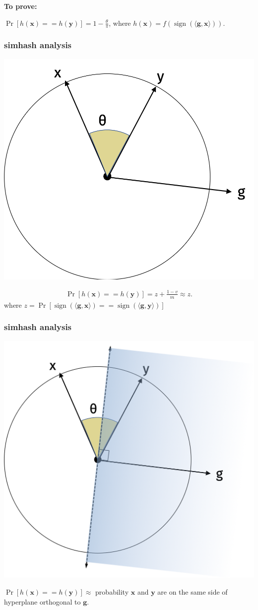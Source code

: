 \documentclass[compress]{beamer}
\newcommand{\bv}[1]{\mathbf{#1}}
\DeclareMathOperator{\sign}{sign}
\begin{document}
\begin{frame}
	\textbf{To prove:} 
	
	$\Pr[h(\bv{x}) == h(\bv{y})] = 1 - \frac{\theta}{\pi}$,  where $h(\bv{x}) = f\left(\sign(\langle \bv{g}, \bv{x} \rangle)\right)$.
	\frametitle{simhash analysis}
	\vspace{-.5em}
	\begin{center}
		\includegraphics[width=.5\textwidth]{simhash1.png}
	\end{center}
\begin{align*}
	\Pr[h(\bv{x}) == h(\bv{y})] = z + \frac{1-v}{m} \approx z.
\end{align*}
where $z = \Pr[\sign(\langle \bv{g}, \bv{x} \rangle) == \sign(\langle \bv{g}, \bv{y} \rangle)]$
\end{frame}

\begin{frame}
	\frametitle{simhash analysis}
	\vspace{-.5em}
	\begin{center}
		\includegraphics[width=.55\textwidth]{simhash2.png}
	\end{center}
\vspace{-.5em}
$\Pr[h(\bv{x}) == h(\bv{y})] \approx$ probability $\bv{x}$ and $\bv{y}$ are on the same side of hyperplane orthogonal to $\bv{g}$.
\end{frame}

\end{document}
